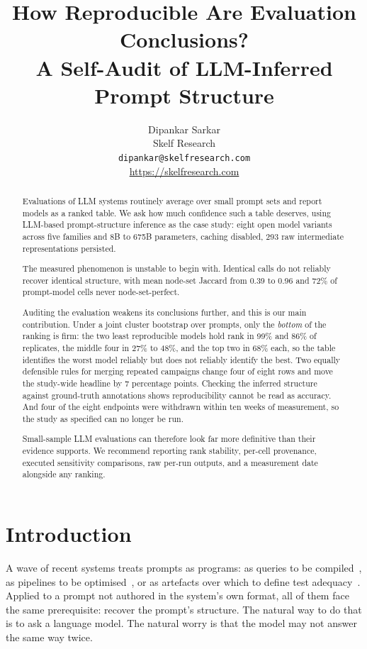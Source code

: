 \documentclass{article}
\title{How Reproducible Are Evaluation Conclusions?\\ A Self-Audit of LLM-Inferred Prompt Structure}
\author{%
  Dipankar Sarkar\\
  Skelf Research\\
  \texttt{dipankar@skelfresearch.com}\\
  \url{https://skelfresearch.com}
}
\begin{document}
\maketitle

\begin{abstract}
Evaluations of LLM systems routinely average over small prompt sets and report models as a ranked table. We ask how much confidence such a table deserves, using LLM-based prompt-structure inference as the case study: eight open model variants across five families and 8B to 675B parameters, caching disabled, 293 raw intermediate representations persisted.

The measured phenomenon is unstable to begin with. Identical calls do not reliably recover identical structure, with mean node-set Jaccard from 0.39 to 0.96 and 72\% of prompt-model cells never node-set-perfect.

Auditing the evaluation weakens its conclusions further, and this is our main contribution. Under a joint cluster bootstrap over prompts, only the \emph{bottom} of the ranking is firm: the two least reproducible models hold rank in 99\% and 86\% of replicates, the middle four in 27\% to 48\%, and the top two in 68\% each, so the table identifies the worst model reliably but does not reliably identify the best. Two equally defensible rules for merging repeated campaigns change four of eight rows and move the study-wide headline by 7 percentage points. Checking the inferred structure against ground-truth annotations shows reproducibility cannot be read as accuracy. And four of the eight endpoints were withdrawn within ten weeks of measurement, so the study as specified can no longer be run.

Small-sample LLM evaluations can therefore look far more definitive than their evidence supports. We recommend reporting rank stability, per-cell provenance, executed sensitivity comparisons, raw per-run outputs, and a measurement date alongside any ranking.
\end{abstract}

\section{Introduction}
\label{sec:intro}

A wave of recent systems treats prompts as programs: as queries to be compiled~\citep{beurerkellner2023lmql}, as pipelines to be optimised~\citep{khattab2024dspy}, or as artefacts over which to define test adequacy~\citep{tambon2026promptcoverage,tan2026skillcoverage}. Applied to a prompt not authored in the system's own format, all of them face the same prerequisite: recover the prompt's structure. The natural way to do that is to ask a language model. The natural worry is that the model may not answer the same way twice.
\end{document}
